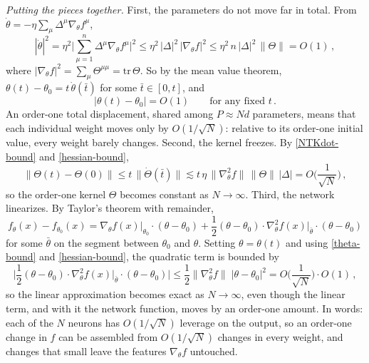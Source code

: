 \documentclass[11pt]{article}
\begin{document}
\emph{Putting the pieces together.} First, the parameters do not move far in total. From $\dot\theta = -\eta\sum_\mu\Delta^\mu\nabla_\theta f^\mu$,
%
\begin{equation}
    |\dot\theta|^2 = \eta^2\Big|\sum_{\mu=1}^n\Delta^\mu\nabla_\theta f^\mu\Big|^2 \leq \eta^2\,|\Delta|^2\,|\nabla_\theta f|^2 \leq \eta^2\,n\,|\Delta|^2\,\|\Theta\| = O(1)\,,
\end{equation}
%
where $|\nabla_\theta f|^2 = \sum_\mu\Theta^{\mu\mu} = \mathrm{tr}\,\Theta$. So by the mean value theorem, $\theta(t)-\theta_0 = t\,\dot\theta(\bar t)$ for some $\bar t\in[0,t]$, and
%
\begin{equation} \label{theta-bound}
    |\theta(t)-\theta_0| = O(1)\qquad\text{for any fixed }t\,.
\end{equation}
%
An order-one total displacement, shared among $P\approx Nd$ parameters, means that each individual weight moves only by $O(1/\sqrt N)$: relative to its order-one initial value, every weight barely changes. Second, the kernel freezes. By \eqref{NTKdot-bound} and \eqref{hessian-bound},
%
\begin{equation} \label{NTK-freeze}
    \big\|\Theta(t) - \Theta(0)\big\| \leq  t\, \|\dot\Theta(\bar t)\| \lesssim t\,\eta\,\|\nabla_\theta^2 f\|\,\|\Theta\|\,|\Delta| = O\Big(\frac{1}{\sqrt N}\Big)\,,
\end{equation}
%
so the order-one kernel $\Theta$ becomes constant as $N\to\infty$. Third, the network linearizes. By Taylor's theorem with remainder,
%
\begin{equation}
    f_{\theta}(x)-f_{\theta_0}(x) = \nabla_\theta f(x)\big|_{\theta_0}\cdot (\theta-\theta_0) +\frac{1}{2} (\theta-\theta_0)\cdot  \nabla_\theta^2 f(x)\big|_{\bar\theta} \cdot (\theta-\theta_0)
\end{equation}
%
for some $\bar\theta$ on the segment between $\theta_0$ and $\theta$. Setting $\theta=\theta(t)$ and using \eqref{theta-bound} and \eqref{hessian-bound}, the quadratic term is bounded by
%
\begin{equation}
    \Big|\frac{1}{2} (\theta-\theta_0)\cdot  \nabla_\theta^2 f(x)\big|_{\bar\theta} \cdot (\theta-\theta_0)\Big| \leq \frac{1}{2} \|\nabla_\theta^2 f\|\; |\theta-\theta_0|^2 = O\Big( \frac{1}{\sqrt N}\Big)\cdot O(1)\,,
\end{equation}
%
so the linear approximation becomes exact as $N\to\infty$, even though the linear term, and with it the network function, moves by an order-one amount. In words: each of the $N$ neurons has $O(1/\sqrt N)$ leverage on the output, so an order-one change in $f$ can be assembled from $O(1/\sqrt N)$ changes in every weight, and changes that small leave the features $\nabla_\theta f$ untouched.
\end{document}
